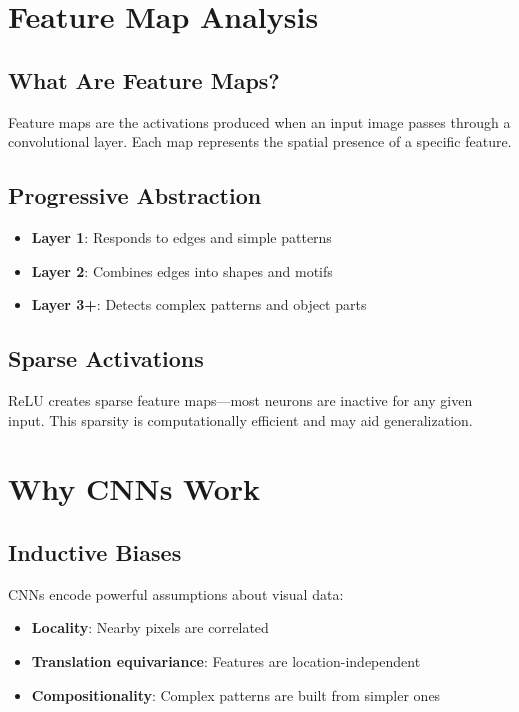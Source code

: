 \documentclass[12pt]{article}
\begin{document}
\section{Feature Map Analysis}

\subsection{What Are Feature Maps?}
Feature maps are the activations produced when an input image passes through a convolutional layer. Each map represents the spatial presence of a specific feature.

\subsection{Progressive Abstraction}
\begin{itemize}
    \item \textbf{Layer 1}: Responds to edges and simple patterns
    \item \textbf{Layer 2}: Combines edges into shapes and motifs
    \item \textbf{Layer 3+}: Detects complex patterns and object parts
\end{itemize}

\subsection{Sparse Activations}
ReLU creates sparse feature maps---most neurons are inactive for any given input. This sparsity is computationally efficient and may aid generalization.

\section{Why CNNs Work}

\subsection{Inductive Biases}
CNNs encode powerful assumptions about visual data:
\begin{itemize}
    \item \textbf{Locality}: Nearby pixels are correlated
    \item \textbf{Translation equivariance}: Features are location-independent
    \item \textbf{Compositionality}: Complex patterns are built from simpler ones
\end{itemize}
\end{document}
